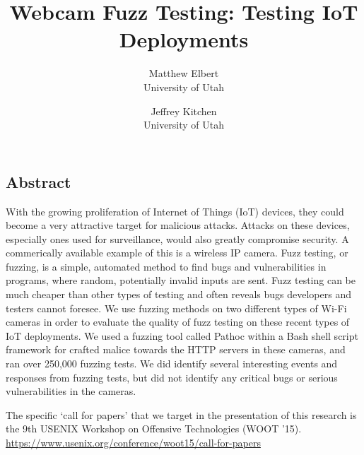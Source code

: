 \documentclass[letterpaper,twocolumn,10pt]{article}
\begin{document}
\date{}

\title{\Large \bf Webcam Fuzz Testing: Testing IoT Deployments}

\author{
{\rm Matthew Elbert}\\
University of Utah
\and
{\rm Jeffrey Kitchen}\\
University of Utah
} %

\maketitle

\thispagestyle{empty}


\subsection*{Abstract}

With the growing proliferation of Internet of Things (IoT) devices, they could become a very attractive target for malicious attacks. Attacks on these devices, especially ones used for surveillance, would also greatly compromise security. A commerically available example of this is a wireless IP camera.
Fuzz testing, or fuzzing, is a simple, automated method to find bugs and vulnerabilities in programs, where random, potentially invalid inputs are sent. Fuzz testing can be much cheaper than other types of testing and often reveals bugs developers and testers cannot foresee. We use fuzzing methods on two different types of Wi-Fi cameras in order to evaluate the quality of fuzz testing on these recent types of IoT deployments. We used a fuzzing tool called Pathoc within a Bash shell script framework for crafted malice towards the HTTP servers in these cameras, and ran over 250,000 fuzzing tests. We did identify several interesting events and responses from fuzzing tests, but did not identify any critical bugs or serious vulnerabilities in the cameras. 



The specific `call for papers' that we target in the presentation of this research is the 9th USENIX Workshop on Offensive Technologies (WOOT '15). \url{https://www.usenix.org/conference/woot15/call-for-papers}
\end{document}
